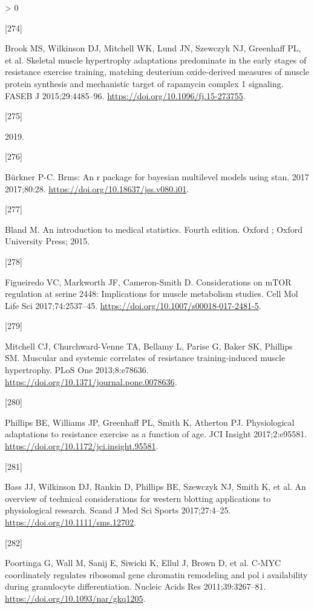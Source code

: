 \documentclass[twoside,10pt]{gihclass} %
\newlength{\cslhangindent}
\newlength{\csllabelwidth}
\newenvironment{CSLReferences}[3] %
 {%
  \setlength{\parindent}{0pt}
  \ifodd #1 \everypar{\setlength{\hangindent}{\cslhangindent}}\ignorespaces\fi
  \ifnum #2 > 0
  \setlength{\parskip}{#2\baselineskip}
  \fi
 }%
 {}
\newcommand{\CSLLeftMargin}[1]{\parbox[t]{\maxof{\widthof{#1}}{\csllabelwidth}}{#1}}
\newcommand{\CSLRightInline}[1]{\parbox[t]{\linewidth}{#1}}
\begin{document}
\begin{CSLReferences}{0}{0}
\leavevmode\hypertarget{ref-RN1642}{}%
\CSLLeftMargin{{[}274{]} }
\CSLRightInline{Brook MS, Wilkinson DJ, Mitchell WK, Lund JN, Szewczyk NJ, Greenhaff PL, et al. Skeletal muscle hypertrophy adaptations predominate in the early stages of resistance exercise training, matching deuterium oxide-derived measures of muscle protein synthesis and mechanistic target of rapamycin complex 1 signaling. FASEB J 2015;29:4485--96. \url{https://doi.org/10.1096/fj.15-273755}.}

\leavevmode\hypertarget{ref-RN2822}{}%
\CSLLeftMargin{{[}275{]} }
\CSLRightInline{2019.}

\leavevmode\hypertarget{ref-RN2562}{}%
\CSLLeftMargin{{[}276{]} }
\CSLRightInline{Bürkner P-C. Brms: An r package for bayesian multilevel models using stan. 2017 2017;80:28. \url{https://doi.org/10.18637/jss.v080.i01}.}

\leavevmode\hypertarget{ref-RN2007}{}%
\CSLLeftMargin{{[}277{]} }
\CSLRightInline{Bland M. An introduction to medical statistics. Fourth edition. Oxford ; Oxford University Press; 2015.}

\leavevmode\hypertarget{ref-RN2309}{}%
\CSLLeftMargin{{[}278{]} }
\CSLRightInline{Figueiredo VC, Markworth JF, Cameron-Smith D. Considerations on mTOR regulation at serine 2448: Implications for muscle metabolism studies. Cell Mol Life Sci 2017;74:2537--45. \url{https://doi.org/10.1007/s00018-017-2481-5}.}

\leavevmode\hypertarget{ref-RN788}{}%
\CSLLeftMargin{{[}279{]} }
\CSLRightInline{Mitchell CJ, Churchward-Venne TA, Bellamy L, Parise G, Baker SK, Phillips SM. Muscular and systemic correlates of resistance training-induced muscle hypertrophy. PLoS One 2013;8:e78636. \url{https://doi.org/10.1371/journal.pone.0078636}.}

\leavevmode\hypertarget{ref-RN2171}{}%
\CSLLeftMargin{{[}280{]} }
\CSLRightInline{Phillips BE, Williams JP, Greenhaff PL, Smith K, Atherton PJ. Physiological adaptations to resistance exercise as a function of age. JCI Insight 2017;2:e95581. \url{https://doi.org/10.1172/jci.insight.95581}.}

\leavevmode\hypertarget{ref-RN1942}{}%
\CSLLeftMargin{{[}281{]} }
\CSLRightInline{Bass JJ, Wilkinson DJ, Rankin D, Phillips BE, Szewczyk NJ, Smith K, et al. An overview of technical considerations for western blotting applications to physiological research. Scand J Med Sci Sports 2017;27:4--25. \url{https://doi.org/10.1111/sms.12702}.}

\leavevmode\hypertarget{ref-RN1832}{}%
\CSLLeftMargin{{[}282{]} }
\CSLRightInline{Poortinga G, Wall M, Sanij E, Siwicki K, Ellul J, Brown D, et al. C-MYC coordinately regulates ribosomal gene chromatin remodeling and pol i availability during granulocyte differentiation. Nucleic Acids Res 2011;39:3267--81. \url{https://doi.org/10.1093/nar/gkq1205}.}


\end{CSLReferences}
\end{document}

